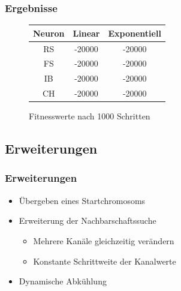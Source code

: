 \begin{frame}
\frametitle{Ergebnisse}
    \center
    \begin{figure}
        \begin{tabular}{|ccc|}
            \hline
            Neuron & Linear & Exponentiell \\
            \hline
            RS & -20000 & -20000 \\
            FS & -20000 & -20000 \\
            IB & -20000 & -20000 \\
            CH & -20000 & -20000 \\
            \hline
        \end{tabular}
    \caption{Fitnesswerte nach 1000 Schritten}
    \end{figure}
\end{frame}

\subsection{Erweiterungen}

\begin{frame}
\frametitle{Erweiterungen}
    \begin{itemize}
        \item Übergeben eines Startchromosoms
        \item Erweiterung der Nachbarschaftssuche
            \begin{itemize}
                \item Mehrere Kanäle gleichzeitig verändern
                \item Konstante Schrittweite der Kanalwerte
            \end{itemize}
        \item Dynamische Abkühlung
    \end{itemize}
\end{frame}
